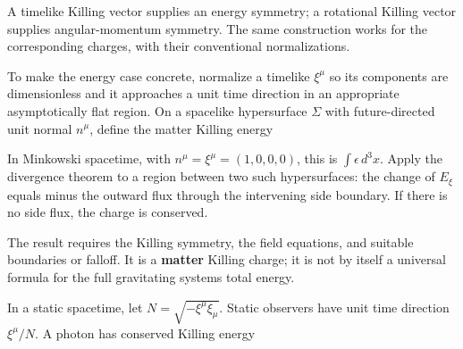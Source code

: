 \documentclass[
  11pt,
  letterpaper,
  oneside,
  openany]{scrbook}
\begin{document}
\begin{center}
\begingroup
{}
\ifdim\wd\grmathbox>\linewidth
\resizebox{\linewidth}{!}{\usebox{\grmathbox}}
\else\usebox{\grmathbox}\fi
\endgroup
\end{center}

A timelike Killing vector supplies an energy symmetry; a rotational
Killing vector supplies angular-momentum symmetry. The same construction
works for the corresponding charges, with their conventional
normalizations.

To make the energy case concrete, normalize a timelike \(\xi^\mu\) so
its components are dimensionless and it approaches a unit time direction
in an appropriate asymptotically flat region. On a spacelike
hypersurface \(\Sigma\) with future-directed unit normal \(n^\mu\),
define the matter Killing energy

\begin{center}
\begingroup
{}
\ifdim\wd\grmathbox>\linewidth
\resizebox{\linewidth}{!}{\usebox{\grmathbox}}
\else\usebox{\grmathbox}\fi
\endgroup
\end{center}

In Minkowski spacetime, with \(n^\mu=\xi^\mu=(1,0,0,0)\), this is
\(\int\epsilon\,d^3x\). Apply the divergence theorem to a region between
two such hypersurfaces: the change of \(E_\xi\) equals minus the outward
flux through the intervening side boundary. If there is no side flux,
the charge is conserved.

The result requires the Killing symmetry, the field equations, and
suitable boundaries or falloff. It is a \textbf{matter} Killing charge;
it is not by itself a universal formula for the full gravitating
system\textquotesingle s total energy.

In a static spacetime, let \(N=\sqrt{-\xi^\mu\xi_\mu}\). Static
observers have unit time direction \(\xi^\mu/N\). A photon has conserved
Killing energy

\begin{center}
\begingroup
{}
\ifdim\wd\grmathbox>\linewidth
\resizebox{\linewidth}{!}{\usebox{\grmathbox}}
\else\usebox{\grmathbox}\fi
\endgroup
\end{center}
\end{document}
